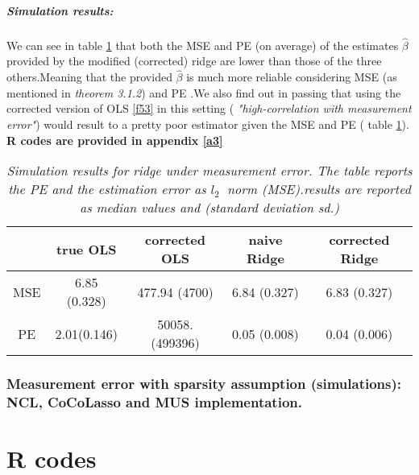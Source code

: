 \documentclass[12pt]{report}
\begin{document}
\paragraph{Simulation results:}
We can see in table \ref{fig9} that both the MSE and PE (on average) of the estimates $\hat{\beta}$ provided by the modified  (corrected) ridge are lower than those of the three others.Meaning that the provided $\hat{\beta}$ is much more reliable considering MSE (as mentioned in \textit{theorem 3.1.2}) and PE .We also find out in passing that using the corrected version of OLS \eqref{f53} in this setting ( \textit{"high-correlation with measurement error"}) would result to a pretty poor estimator given the MSE and PE ( table \ref{fig9}). \textbf{R codes are provided in appendix \ref{a3}}

	\begin{table}[h]
	\begin{center}
		\begin{tabular}{|c|c|c|c|c|}
			\hline
			 & \textbf{true OLS }&\textbf{corrected OLS}&\textbf{naive Ridge}  & \textbf{corrected Ridge}\\
			\hline
			MSE&6.85 (0.328) & 477.94 (4700)& 6.84 (0.327) & 6.83 (0.327)\\
	
			PE & 2.01(0.146) & 50058. (499396)  & 0.05 (0.008) & 0.04 (0.006)  \\
			\hline
\end{tabular}
\end{center}
\caption[Simulation results for ridge under measurement error]{\textit{Simulation results for ridge under measurement error. The table reports the PE and the estimation error as $l_{2}\ $ norm (MSE).results are reported as median values and (standard deviation sd.) }}
\label{fig9}
\end{table}
\subsection{Measurement error with sparsity assumption (simulations): NCL, CoCoLasso and MUS implementation.}
\appendix
\chapter{R codes}
\end{document}
